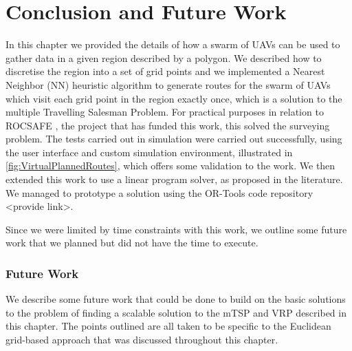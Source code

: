 \section{Conclusion and Future Work}
In this chapter we provided the details of how a swarm of UAVs can be used to gather data in a given region described by a polygon. We described how to discretise the region into a set of grid points and we implemented a Nearest Neighbor (NN) heuristic algorithm to generate routes for the swarm of UAVs which visit each grid point in the region exactly once, which is a solution to the multiple Travelling Salesman Problem. For practical purposes in relation to ROCSAFE \cite{rocsafeNUIG}, the project that has funded this work, this solved the surveying problem. The tests carried out in simulation were carried out successfully, using the user interface and custom simulation environment, illustrated in \ref{fig:VirtualPlannedRoutes}, which offers some validation to the work. We then extended this work to use a linear program solver, as proposed in the literature. We managed to prototype a solution using the OR-Tools code repository <provide link>.

Since we were limited by time constraints with this work, we outline some future work that we planned but did not have the time to execute.\par

\subsubsection{Future Work}
We describe some future work that could be done to build on the basic solutions to the problem of finding a scalable solution to the mTSP and VRP described in this chapter. The points outlined are all taken to be specific to the Euclidean grid-based approach that was discussed throughout this chapter.

